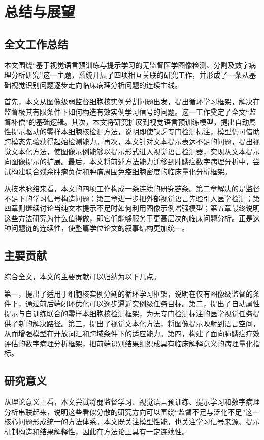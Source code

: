 \chapter{总结与展望}

\section{全文工作总结}
本文围绕“基于视觉语言预训练与提示学习的无监督医学图像检测、分割及数字病理分析研究”这一主题，系统开展了四项相互关联的研究工作，并形成了一条从基础视觉识别问题逐步走向临床病理分析问题的连续主线。

首先，本文从图像级弱监督细胞核实例分割问题出发，提出循环学习框架，解决在监督极其有限条件下如何构造有效实例学习信号的问题。这一工作奠定了全文“监督补偿”的基础逻辑。其次，本文将研究扩展到视觉语言预训练模型，提出自动属性提示驱动的零样本细胞核检测方法，说明即使缺乏专门检测标注，模型仍可借助跨模态先验获得起始检测能力。再次，本文针对文本提示表达不足的问题，提出视觉文本化方法，使图像示例能够以提示形式进入视觉语言检测器，实现从文本提示向图像提示的扩展。最后，本文将前述方法能力迁移到肺鳞癌数字病理分析中，尝试构建联合残余肿瘤负荷和肿瘤周围免疫细胞密度的临床量化分析框架。

从技术脉络来看，本文的四项工作构成一条连续的研究链条。第二章解决的是监督不足下的学习信号构造问题；第三章进一步把外部视觉语言先验引入医学检测；第四章则继续讨论当纯文本提示不足时如何利用图像示例增强模型；第五章最终说明这些方法研究为什么值得做，即它们能够服务于更高层次的临床问题分析。正是这种问题链的连续性，使整篇学位论文的叙事结构更加统一。

\section{主要贡献}
综合全文，本文的主要贡献可以归纳为以下几点。

第一，提出了适用于细胞核实例分割的循环学习框架，说明在仅有图像级监督的条件下，通过前后端闭环优化可以逐步逼近实例级任务目标。第二，提出了自动属性提示与自训练联合的零样本细胞核检测框架，为无专门检测标注的医学视觉任务提供了新的解决路径。第三，提出了视觉文本化方法，将图像提示映射到语言空间，从而增强模型在开放词汇和跨域条件下的适应能力。第四，构建了面向肺鳞癌疗效评估的数字病理分析框架，把前端识别结果组织成具有临床解释意义的病理量化指标。

\section{研究意义}
从理论意义上看，本文尝试将弱监督学习、视觉语言预训练、提示学习和数字病理分析串联起来，说明这些看似分散的研究方向可以围绕“监督不足与泛化不足”这一核心问题形成统一的方法体系。本文既关注模型性能，也关注学习信号来源、提示机制构造和结果解释性，因此在方法论上具有一定连续性。


